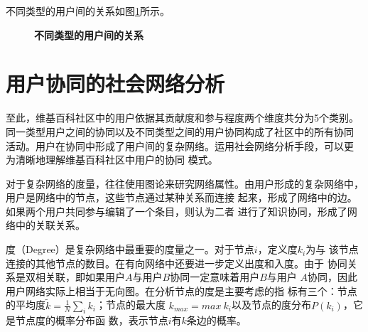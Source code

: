 不同类型的用户间的关系如图\ref{fig:user-cat}所示。
\begin{figure}[htb]
  \centering
  \caption{\small{\textbf{不同类型的用户间的关系}}}
  \label{fig:user-cat}
\end{figure}
\section{用户协同的社会网络分析}
\label{sec:social-analysis}


至此，维基百科社区中的用户依据其贡献度和参与程度两个维度共分为5个类别。
同一类型用户之间的协同以及不同类型之间的用户协同构成了社区中的所有协同
活动。用户在协同中形成了用户间的复杂网络。运用社会网络分析手段，可以更
为清晰地理解维基百科社区中用户的协同
模式。

对于复杂网络的度量，往往使用图论来研究网络属性。由用户形成的复杂网络中，用户是网络中的节点，这些节点通过某种关系而连接
起来，形成了网络中的边。如果两个用户共同参与编辑了一个条目，则认为二者
进行了知识协同，形成了网络中的关联关系。

度（Degree）是复杂网络中最重要的度量之一。对于节点$i$，定义度$k_i$为与
该节点连接的其他节点的数目。在有向网络中还要进一步定义出度和入度。由于
协同关系是双相关联，即如果用户$A$与用户$B$协同一定意味着用户$B$与用户
$A$协同，因此用户网络实际上相当于无向图。在分析节点的度是主要考虑的指
标有三个：节点的平均度$\tilde{ k}=\frac{1}{N}\sum_i k_i$；节点的最大度
$k_{max}=max \  k_i$以及节点的度分布$P(k_i)$，它是节点度的概率分布函
数，表示节点$i$有$k$条边的概率。

